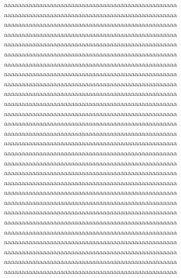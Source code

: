 aaaaaaaaaaaaaaaaaaaaaaaaaaaaaaaaaaaaaaaaaaaaaaaaa
aaaaaaaaaaaaaaaaaaaaaaaaaaaaaaaaaaaaaaaaaaaaaaaaa
aaaaaaaaaaaaaaaaaaaaaaaaaaaaaaaaaaaaaaaaaaaaaaaaa
aaaaaaaaaaaaaaaaaaaaaaaaaaaaaaaaaaaaaaaaaaaaaaaaa
aaaaaaaaaaaaaaaaaaaaaaaaaaaaaaaaaaaaaaaaaaaaaaaaa
aaaaaaaaaaaaaaaaaaaaaaaaaaaaaaaaaaaaaaaaaaaaaaaaa
aaaaaaaaaaaaaaaaaaaaaaaaaaaaaaaaaaaaaaaaaaaaaaaaa
aaaaaaaaaaaaaaaaaaaaaaaaaaaaaaaaaaaaaaaaaaaaaaaaa
aaaaaaaaaaaaaaaaaaaaaaaaaaaaaaaaaaaaaaaaaaaaaaaaa
aaaaaaaaaaaaaaaaaaaaaaaaaaaaaaaaaaaaaaaaaaaaaaaaa
aaaaaaaaaaaaaaaaaaaaaaaaaaaaaaaaaaaaaaaaaaaaaaaaa
aaaaaaaaaaaaaaaaaaaaaaaaaaaaaaaaaaaaaaaaaaaaaaaaa
aaaaaaaaaaaaaaaaaaaaaaaaaaaaaaaaaaaaaaaaaaaaaaaaa
aaaaaaaaaaaaaaaaaaaaaaaaaaaaaaaaaaaaaaaaaaaaaaaaa
aaaaaaaaaaaaaaaaaaaaaaaaaaaaaaaaaaaaaaaaaaaaaaaaa
aaaaaaaaaaaaaaaaaaaaaaaaaaaaaaaaaaaaaaaaaaaaaaaaa
aaaaaaaaaaaaaaaaaaaaaaaaaaaaaaaaaaaaaaaaaaaaaaaaa
aaaaaaaaaaaaaaaaaaaaaaaaaaaaaaaaaaaaaaaaaaaaaaaaa
aaaaaaaaaaaaaaaaaaaaaaaaaaaaaaaaaaaaaaaaaaaaaaaaa
aaaaaaaaaaaaaaaaaaaaaaaaaaaaaaaaaaaaaaaaaaaaaaaaa
aaaaaaaaaaaaaaaaaaaaaaaaaaaaaaaaaaaaaaaaaaaaaaaaa
aaaaaaaaaaaaaaaaaaaaaaaaaaaaaaaaaaaaaaaaaaaaaaaaa
aaaaaaaaaaaaaaaaaaaaaaaaaaaaaaaaaaaaaaaaaaaaaaaaa
aaaaaaaaaaaaaaaaaaaaaaaaaaaaaaaaaaaaaaaaaaaaaaaaa
aaaaaaaaaaaaaaaaaaaaaaaaaaaaaaaaaaaaaaaaaaaaaaaaa
aaaaaaaaaaaaaaaaaaaaaaaaaaaaaaaaaaaaaaaaaaaaaaaaa
aaaaaaaaaaaaaaaaaaaaaaaaaaaaaaaaaaaaaaaaaaaaaaaaa
aaaaaaaaaaaaaaaaaaaaaaaaaaaaaaaaaaaaaaaaaaaaaaaaa